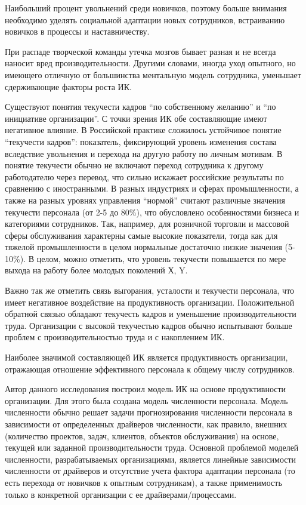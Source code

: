Наибольший процент увольнений среди новичков, поэтому больше внимания необходимо уделять социальной адаптации новых сотрудников, встраиванию новичков в процессы и наставничеству.

При распаде творческой команды утечка мозгов бывает разная и не всегда наносит вред производительности. 
Другими словами, иногда уход опытного, но имеющего отличную от большинства ментальную модель сотрудника, уменьшает сдерживающие факторы роста ИК.

Существуют понятия текучести кадров ``по собственному желанию'' и ``по инициативе организации''. 
С точки зрения ИК обе составляющие имеют негативное влияние. 
В Российской практике сложилось устойчивое понятие ``текучести кадров'': показатель, фиксирующий уровень изменения состава вследствие увольнения и перехода на другую работу по личным мотивам. 
В понятие текучести обычно не включают переход сотрудника к другому работодателю через перевод, что сильно искажает российские результаты по сравнению с иностранными. В разных индустриях и сферах промышленности, а также на разных уровнях управления ``нормой'' считают различные значения текучести персонала (от 2-5 до 80\%), что обусловлено особенностями бизнеса и категориями сотрудников. 
Так, например, для розничной торговли и массовой сферы обслуживания характерны самые высокие показатели, тогда как для тяжелой промышленности в целом нормальные достаточно низкие значения (5-10\%).
В целом, можно отметить, что уровень текучести повышается по мере выхода на работу более молодых поколений Х, Y.

Важно так же отметить связь выгорания, усталости и текучести персонала, что имеет негативное воздействие на продуктивность организации.
Положительной обратной связью обладают текучесть кадров и уменьшение производительности труда. 
Организации с высокой текучестью кадров обычно испытывают больше проблем с производительностью труда и с накоплением ИК. 

Наиболее значимой составляющей ИК является продуктивность организации, отражающая отношение эффективного персонала к общему числу сотрудников.  

Автор данного исследования построил модель ИК на основе продуктивности организации. 
Для этого была создана модель численности персонала. 
Модель численности обычно решает задачи прогнозирования численности персонала в зависимости от определенных драйверов численности, как правило, внешних (количество проектов, задач, клиентов, объектов обслуживания) на основе, текущей или заданной производительности труда.
Основной проблемой моделей численности, разрабатываемых организациями, является линейные зависимости численности от драйверов и отсутствие учета фактора адаптации персонала (то есть перехода от новичков к опытным сотрудникам), а также применимость только в конкретной организации с ее драйверами/процессами.

